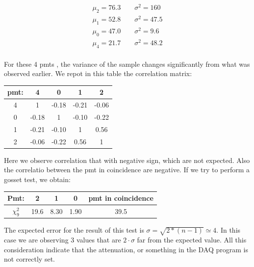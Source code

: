 \begin{equation*}
\begin{split}
\mu_{2} = 76.3 \qquad \sigma^{2} = 160  \\
\mu_{1} = 52.8 \qquad \sigma^{2} = 47.5 \\
\mu_{0} = 47.0 \qquad \sigma^{2} = 9.6  \\
\mu_{4} = 21.7 \qquad \sigma^{2} = 48.2 \\
\end{split}
\end{equation*}

For these 4 pmts , the variance of the sample changes significantly from what was observed earlier. We repot in this table the correlation matrix:

\begin{center}
\begin{tabular}{|c|c|c|c|c|}
\hline 
pmt: & 4 & 0 & 1 & 2 \\ 
\hline 
4 	 & 1 & -0.18  & -0.21  & -0.06  \\ 
\hline 
0 	 & -0.18  & 1 & -0.10  & -0.22  \\ 
\hline 
1    & -0.21  & -0.10  & 1 & 0.56  \\ 
\hline 
2    & -0.06 & -0.22  & 0.56  & 1 \\ 
\hline 
\end{tabular} 
\end{center}

Here we observe correlation that with negative sign, which are not expected. Also the correlatio between the pmt in coincidence are negative.
If we try to perform a gosset test, we obtain:

\begingroup
\setlength{\tabcolsep}{8pt} %
\renewcommand{\arraystretch}{1.2} %
\begin{center}
\begin{tabular}{|c|c|c|c|c|}
\hline 
Pmt: & 2 & 1 & 0 & pmt in coincidence \\ 
\hline
$\chi^{2}_{9}$ & 19.6 & 8.30 & 1.90 & 39.5\\ 
\hline
\end{tabular} 
\end{center}
\endgroup
\smallskip

The expected error for the result of this test is $\sigma = \sqrt{2*(n-1)} \simeq 4$. In this case we are observing 3 values that are $2\cdot \sigma $ far from the expected value. All this consideration indicate that the attenuation, or something in the DAQ program is not correctly set. 

